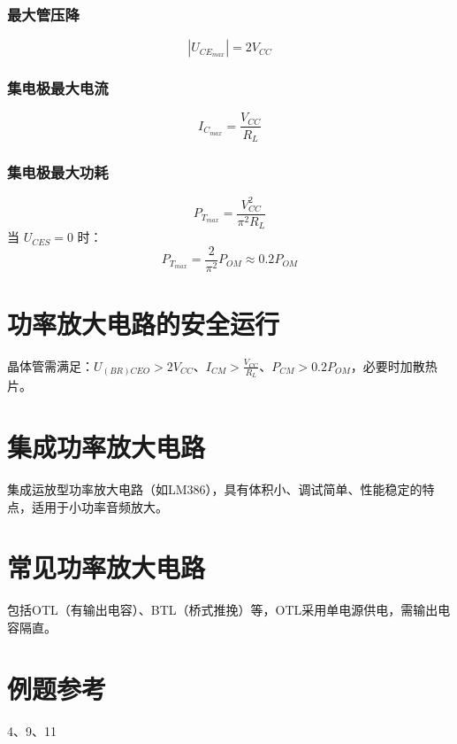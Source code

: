 \subsubsection{最大管压降}
\[ |U_{CE_{max}}|=2V_{CC} \]

\subsubsection{集电极最大电流}
\[ I_{C_{max}}=\frac{V_{CC}}{R_L} \]

\subsubsection{集电极最大功耗}
\[ P_{T_{max}}=\frac{V^2_{CC}}{\pi^2R_L} \]
当 $U_{CES}=0$ 时：
\[ P_{T_{max}}=\frac{2}{\pi^2}P_{OM}\approx0.2P_{OM} \]

\section{功率放大电路的安全运行}
晶体管需满足：$U_{(BR)CEO} > 2V_{CC}$、$I_{CM} > \frac{V_{CC}}{R_L}$、$P_{CM} > 0.2P_{OM}$，必要时加散热片。

\section{集成功率放大电路}
集成运放型功率放大电路（如LM386），具有体积小、调试简单、性能稳定的特点，适用于小功率音频放大。

\section{常见功率放大电路}
包括OTL（有输出电容）、BTL（桥式推挽）等，OTL采用单电源供电，需输出电容隔直。

\section{例题参考}
4、9、11